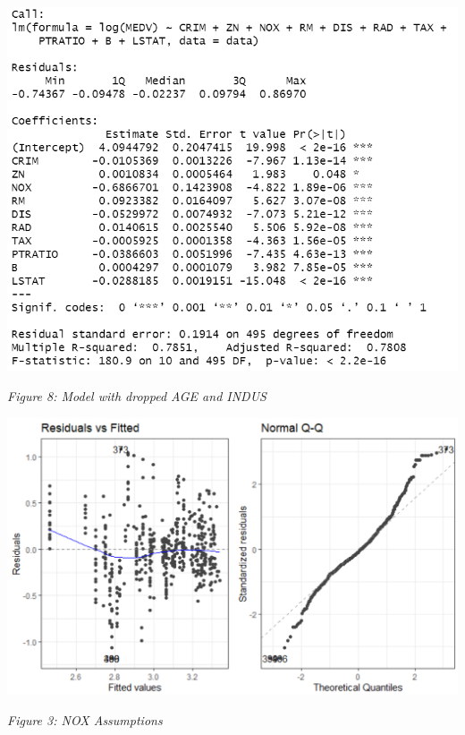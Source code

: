 \documentclass[a4paper,9pt,twocolumn,twoside,]{pinp}
\begin{document}
\begin{center}\includegraphics[width=0.95\linewidth]{dropped} \end{center}

\emph{Figure 8: Model with dropped AGE and INDUS} \newline \newline
\newline \newline \newline

\begin{center}\includegraphics[width=0.95\linewidth]{nox_ass} \end{center}

\emph{Figure 3: NOX Assumptions} \newline
\end{document}
